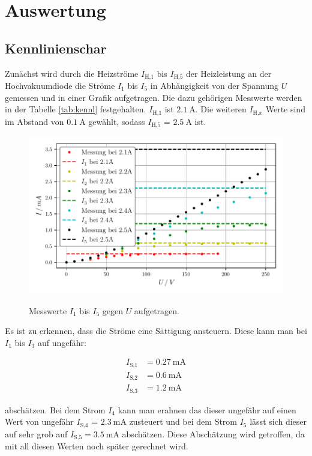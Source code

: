 \newpage
\section{Auswertung}
\subsection{Kennlinienschar}
Zunächst wird durch die Heizströme $I_{\text{H,}1}$ bis $I_{\text{H,}5}$ der Heizleistung an der Hochvakuumdiode die Ströme $I_1$ bis $I_5$ in Abhängigkeit von der Spannung $U$ gemessen und 
in einer Grafik aufgetragen. Die dazu gehörigen Messwerte werden in der Tabelle \ref{tab:kennl} festgehalten. $I_{\text{H,}1}$ ist $\SI{2.1}{\ampere}$. Die weiteren $I_{\text{H,}x}$ Werte sind im Abstand von 
$\SI{0.1}{\ampere}$ gewählt, sodass $I_{\text{H,}5}$ = $\SI{2.5}{\ampere}$ ist.

\begin{figure}
    \centering
    \includegraphics[width=\textwidth]{Daten/kennlinie.pdf}
    \label{fig:kennlinie}
    \caption{Messwerte $I_1$ bis $I_5$ gegen $U$ aufgetragen.}
\end{figure}

Es ist zu erkennen, dass die Ströme eine Sättigung ansteuern. Diese kann man bei $I_{1}$ bis $I_{3}$ auf ungefähr:

\begin{align*}
    I_\text{S,1} &= \SI{0.27 }{\milli\ampere} \\
    I_\text{S,2} &= \SI{0.6}{\milli\ampere} \\
    I_\text{S,3} &= \SI{1.2}{\milli\ampere}
  \end{align*}

  abschätzen. Bei dem Strom $I_{4}$ kann man erahnen das dieser ungefähr auf einen Wert von ungefähr $I_\text{S,4}$ = $\SI{2.3}{\milli\ampere}$ zusteuert 
  und bei dem Strom $I_{5}$ lässt sich dieser auf sehr grob auf $I_\text{S,5} = \SI{3.5}{\milli\ampere}$ abschätzen. Diese Abschätzung wird getroffen, da mit all diesen Werten noch später gerechnet wird.

